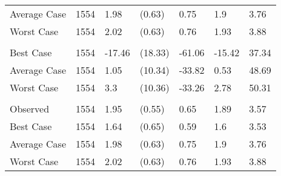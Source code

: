 \begin{tabular}[t]{lllllll}
\hspace{1em}\hspace{1em}Average Case & 1554 & 1.98 & (0.63) & 0.75 & 1.9 & \vphantom{1} 3.76\\
\hspace{1em}Worst Case & 1554 & 2.02 & (0.63) & 0.76 & 1.93 & \vphantom{1} 3.88\\
\addlinespace[0.3em]
\multicolumn{7}{l}{\textbf{\% Change Average Price}}\\
\hspace{1em}Best Case & 1554 & -17.46 & (18.33) & -61.06 & -15.42 & 37.34\\
\hspace{1em}Average Case & 1554 & 1.05 & (10.34) & -33.82 & 0.53 & 48.69\\
\hspace{1em}Worst Case & 1554 & 3.3 & (10.36) & -33.26 & 2.78 & 50.31\\
\addlinespace[0.3em]
\multicolumn{7}{l}{\textbf{Median Price}}\\
\hspace{1em}Observed & 1554 & 1.95 & (0.55) & 0.65 & 1.89 & 3.57\\
\hspace{1em}Best Case & 1554 & 1.64 & (0.65) & 0.59 & 1.6 & 3.53\\
\hspace{1em}Average Case & 1554 & 1.98 & (0.63) & 0.75 & 1.9 & 3.76\\
\hspace{1em}Worst Case & 1554 & 2.02 & (0.63) & 0.76 & 1.93 & 3.88\\
\bottomrule
\end{tabular}
